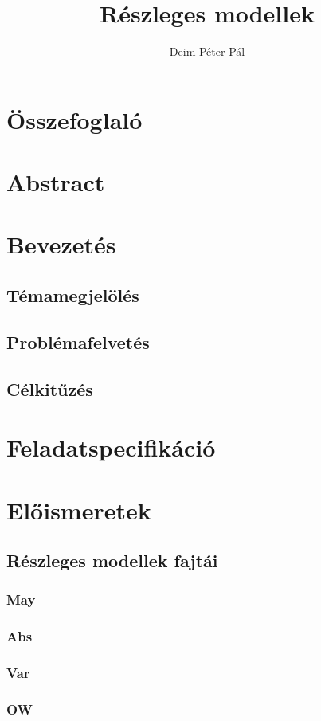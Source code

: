 \documentclass[12pt]{article}
\title{Részleges modellek}
\author{Deim Péter Pál}
\begin{document}
	
	\tableofcontents
	
	\newpage
	\section{Összefoglaló}	
	\section{Abstract}	
	\section{Bevezetés}	
	\subsection{Témamegjelölés}
	\subsection{Problémafelvetés}
	\subsection{Célkitűzés}
	\section{Feladatspecifikáció}
	\section{Előismeretek}
	\subsection{Részleges modellek fajtái}
	\subsubsection{May}
	\subsubsection{Abs}
	\subsubsection{Var}
	\subsubsection{OW}
\end{document}
